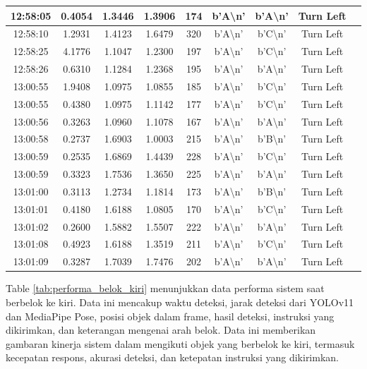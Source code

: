\begin{table}[H]
\begin{tabular}{|c|c|c|c|c|c|c|c|c|}
    12:58:05 & 0.4054 & 1.3446 & 1.3906 & 174 & b'A\textbackslash n' & b'A\textbackslash n' & Turn Left \\ \hline
    12:58:10 & 1.2931 & 1.4123 & 1.6479 & 320 & b'A\textbackslash n' & b'C\textbackslash n' & Turn Left \\ \hline
    12:58:25 & 4.1776 & 1.1047 & 1.2300 & 197 & b'A\textbackslash n' & b'C\textbackslash n' & Turn Left \\ \hline
    12:58:26 & 0.6310 & 1.1284 & 1.2368 & 195 & b'A\textbackslash n' & b'A\textbackslash n' & Turn Left \\ \hline
    13:00:55 & 1.9408 & 1.0975 & 1.0855 & 185 & b'A\textbackslash n' & b'C\textbackslash n' & Turn Left \\ \hline
    13:00:55 & 0.4380 & 1.0975 & 1.1142 & 177 & b'A\textbackslash n' & b'C\textbackslash n' & Turn Left \\ \hline
    13:00:56 & 0.3263 & 1.0960 & 1.1078 & 167 & b'A\textbackslash n' & b'A\textbackslash n' & Turn Left \\ \hline
    13:00:58 & 0.2737 & 1.6903 & 1.0003 & 215 & b'A\textbackslash n' & b'B\textbackslash n' & Turn Left \\ \hline
    13:00:59 & 0.2535 & 1.6869 & 1.4439 & 228 & b'A\textbackslash n' & b'C\textbackslash n' & Turn Left \\ \hline
    13:00:59 & 0.3323 & 1.7536 & 1.3650 & 225 & b'A\textbackslash n' & b'A\textbackslash n' & Turn Left \\ \hline
    13:01:00 & 0.3113 & 1.2734 & 1.1814 & 173 & b'A\textbackslash n' & b'B\textbackslash n' & Turn Left \\ \hline
    13:01:01 & 0.4180 & 1.6188 & 1.0805 & 170 & b'A\textbackslash n' & b'C\textbackslash n' & Turn Left \\ \hline
    13:01:02 & 0.2600 & 1.5882 & 1.5507 & 222 & b'A\textbackslash n' & b'A\textbackslash n' & Turn Left \\ \hline
    13:01:08 & 0.4923 & 1.6188 & 1.3519 & 211 & b'A\textbackslash n' & b'C\textbackslash n' & Turn Left \\ \hline
    13:01:09 & 0.3287 & 1.7039 & 1.7476 & 202 & b'A\textbackslash n' & b'A\textbackslash n' & Turn Left \\ \hline
\end{tabular}
\end{table}

Table \ref{tab:performa_belok_kiri} menunjukkan data performa sistem saat berbelok ke kiri. Data ini mencakup waktu deteksi, jarak deteksi dari YOLOv11 dan MediaPipe Pose, posisi objek dalam frame, hasil deteksi, instruksi yang dikirimkan, dan keterangan mengenai arah belok. Data ini memberikan gambaran kinerja sistem dalam mengikuti objek yang berbelok ke kiri, termasuk kecepatan respons, akurasi deteksi, dan ketepatan instruksi yang dikirimkan.

